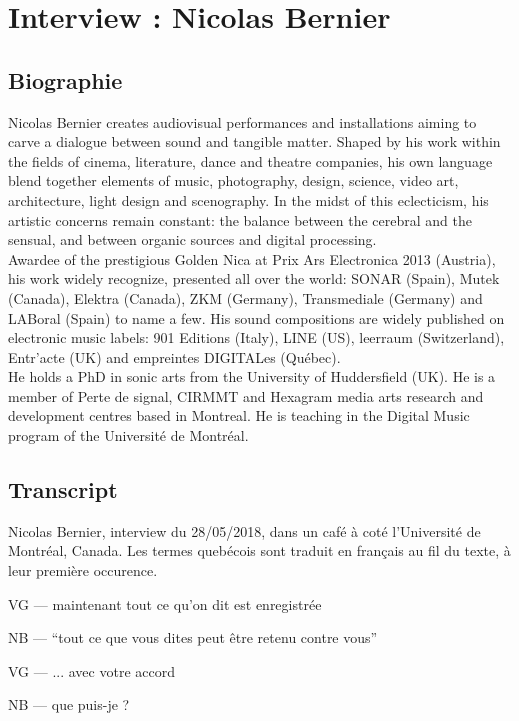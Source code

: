 \chapter{Interview : Nicolas Bernier}
\label{appendix:bernier}

\section*{Biographie}

\noindent Nicolas Bernier creates audiovisual performances and installations aiming to carve a dialogue between sound and tangible matter. Shaped by his work within the fields of cinema, literature, dance and theatre companies, his own language blend together elements of music, photography, design, science, video art, architecture, light design and scenography. In the midst of this eclecticism, his artistic concerns remain constant: the balance between the cerebral and the sensual, and between organic sources and digital processing.\\
\indent Awardee of the prestigious Golden Nica at Prix Ars Electronica 2013 (Austria), his work widely recognize, presented all over the world: SONAR (Spain), Mutek (Canada), Elektra (Canada), ZKM (Germany), Transmediale (Germany) and LABoral (Spain) to name a few. His sound compositions are widely published on electronic music labels: 901 Editions (Italy), LINE (US), leerraum (Switzerland), Entr’acte (UK) and empreintes DIGITALes (Québec).\\
\indent He holds a PhD in sonic arts from the University of Huddersfield (UK). He is a member of Perte de signal, CIRMMT and Hexagram media arts research and development centres based in Montreal. He is teaching in the Digital Music program of the Université de Montréal. 


\section*{Transcript}

\noindent Nicolas Bernier, interview du 28/05/2018, dans un café à coté l'Université de Montréal, Canada. Les termes quebécois sont traduit en français au fil du texte, à leur première occurence.
 
VG — maintenant tout ce qu'on dit est enregistrée 

NB — ``tout ce que vous dites peut être retenu contre vous'' 

VG — ... avec votre accord 

NB — que puis-je ?

